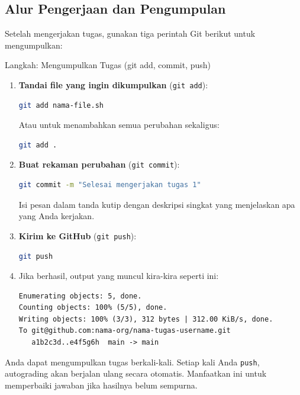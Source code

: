 \documentclass[
    a4paper,
    11pt,
    parskip=half
]{scrartcl}
\begin{document}
\subsection{Alur Pengerjaan dan Pengumpulan}

Setelah mengerjakan tugas, gunakan tiga perintah Git berikut untuk mengumpulkan:

\begin{stepbox}{Langkah: Mengumpulkan Tugas (git add, commit, push)}
\begin{enumerate}
    \item \textbf{Tandai file yang ingin dikumpulkan} (\texttt{git add}):
\begin{lstlisting}[language=bash]
git add nama-file.sh
\end{lstlisting}
    Atau untuk menambahkan semua perubahan sekaligus:
\begin{lstlisting}[language=bash]
git add .
\end{lstlisting}

    \item \textbf{Buat rekaman perubahan} (\texttt{git commit}):
\begin{lstlisting}[language=bash]
git commit -m "Selesai mengerjakan tugas 1"
\end{lstlisting}
    Isi pesan dalam tanda kutip dengan deskripsi singkat yang menjelaskan apa yang Anda kerjakan.

    \item \textbf{Kirim ke GitHub} (\texttt{git push}):
\begin{lstlisting}[language=bash]
git push
\end{lstlisting}

    \item Jika berhasil, output yang muncul kira-kira seperti ini:
\begin{lstlisting}
Enumerating objects: 5, done.
Counting objects: 100% (5/5), done.
Writing objects: 100% (3/3), 312 bytes | 312.00 KiB/s, done.
To git@github.com:nama-org/nama-tugas-username.git
   a1b2c3d..e4f5g6h  main -> main
\end{lstlisting}
\end{enumerate}
\end{stepbox}

\begin{tipbox}
Anda dapat mengumpulkan tugas berkali-kali. Setiap kali Anda \texttt{push}, autograding akan berjalan ulang secara otomatis. Manfaatkan ini untuk memperbaiki jawaban jika hasilnya belum sempurna.
\end{tipbox}
\end{document}
